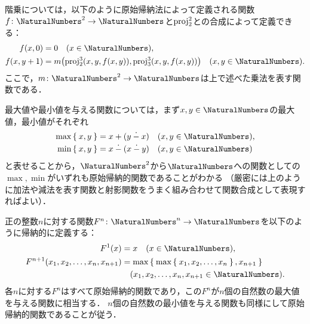 階乗については，以下のように原始帰納法によって定義される関数\(f \colon \NaturalNumbers^2 \to \NaturalNumbers\)と\(\operatorname{proj}_2^2\)との合成によって定義できる：
\begin{align*}
	\apply{f}{x, 0}     & = 0 \quad \text{(\(x \in \NaturalNumbers\))},                                                   \\
	\apply{f}{x, y + 1} & = \apply{m}{\apply{\proj_2^3}{x, y, \apply{f}{x, y}}, \apply{\proj_3^3}{x, y, \apply{f}{x, y}}}
	\quad \text{(\(x, y \in \NaturalNumbers\))}.
\end{align*}
ここで，\(m \colon \NaturalNumbers^2 \to \NaturalNumbers\)は上で述べた乗法を表す関数である．

最大値や最小値を与える関数については，まず\(x, y \in \NaturalNumbers\)の最大値，最小値がそれぞれ
\begin{align*}
	\max \Set{x, y} & = x + \paren{y \entireminus x} \quad \text{(\(x, y \in \NaturalNumbers\)),}           \\
	\min \Set{x, y} & = x \entireminus \paren{x \entireminus y} \quad \text{(\(x, y \in \NaturalNumbers\))}
\end{align*}
と表せることから，\(\NaturalNumbers^2\)から\(\NaturalNumbers\)への関数としての\(\max, \min\)がいずれも原始帰納的関数であることがわかる
（厳密には上のように加法や減法を表す関数と射影関数をうまく組み合わせて関数合成として表現すればよい）．

正の整数\(n\)に対する関数\(F^n \colon \NaturalNumbers^n \to \NaturalNumbers\)を以下のように帰納的に定義する：
\begin{align*}
	\apply{F^1}{x}                                     & = x \quad \text{(\(x \in \NaturalNumbers\))},                           \\
	\apply{F^{n + 1}}{x_1, x_2, \dots, x_n, x_{n + 1}} & = \max \Set{\max \Set{x_1, x_2, \dots, x_{n}}, x_{n + 1}}               \\
	                                                   & \quad \text{(\(x_1, x_2, \dots, x_n, x_{n + 1} \in \NaturalNumbers\))}.
\end{align*}
各\(n\)に対する\(F^n\)はすべて原始帰納的関数であり，この\(F^n\)が\(n\)個の自然数の最大値を与える関数に相当する．
\(n\)個の自然数の最小値を与える関数も同様にして原始帰納的関数であることが従う．

\subsection*{}

